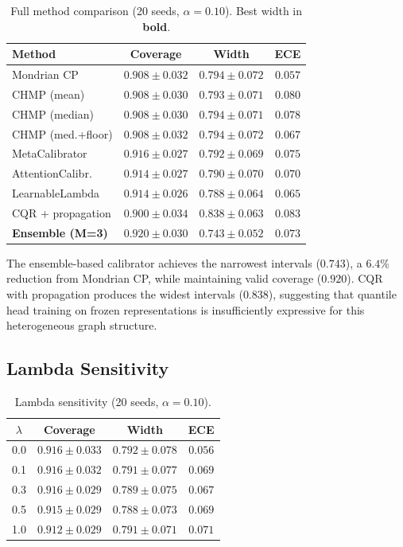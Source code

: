 \documentclass[twoside,11pt]{article}
\begin{document}
\begin{table}[ht]
\centering
\caption{Full method comparison (20 seeds, $\alpha = 0.10$).
Best width in \textbf{bold}.}
\label{tab:full}
\begin{tabular}{lccc}
\toprule
Method & Coverage & Width & ECE \\
\midrule
Mondrian CP & $0.908 \pm 0.032$ & $0.794 \pm 0.072$ & $\mathbf{0.057}$ \\
CHMP (mean) & $0.908 \pm 0.030$ & $0.793 \pm 0.071$ & $0.080$ \\
CHMP (median) & $0.908 \pm 0.030$ & $0.794 \pm 0.071$ & $0.078$ \\
CHMP (med.+floor) & $0.908 \pm 0.032$ & $0.794 \pm 0.072$ & $0.067$ \\
MetaCalibrator & $0.916 \pm 0.027$ & $0.792 \pm 0.069$ & $0.075$ \\
AttentionCalibr. & $0.914 \pm 0.027$ & $0.790 \pm 0.070$ & $0.070$ \\
LearnableLambda & $0.914 \pm 0.026$ & $0.788 \pm 0.064$ & $0.065$ \\
CQR + propagation & $0.900 \pm 0.034$ & $0.838 \pm 0.063$ & $0.083$ \\
\textbf{Ensemble (M=3)} & $0.920 \pm 0.030$ & $\mathbf{0.743 \pm 0.052}$ & $0.073$ \\
\bottomrule
\end{tabular}
\end{table}

The ensemble-based calibrator achieves the narrowest intervals ($0.743$), a
$6.4\%$ reduction from Mondrian CP, while maintaining valid coverage ($0.920$).
CQR with propagation produces the widest intervals ($0.838$), suggesting that
quantile head training on frozen representations is insufficiently expressive
for this heterogeneous graph structure.

\subsection{Lambda Sensitivity}

\begin{table}[ht]
\centering
\caption{Lambda sensitivity (20 seeds, $\alpha = 0.10$).}
\label{tab:lambda}
\begin{tabular}{cccc}
\toprule
$\lambda$ & Coverage & Width & ECE \\
\midrule
0.0 & $0.916 \pm 0.033$ & $0.792 \pm 0.078$ & $0.056$ \\
0.1 & $0.916 \pm 0.032$ & $0.791 \pm 0.077$ & $0.069$ \\
0.3 & $0.916 \pm 0.029$ & $0.789 \pm 0.075$ & $0.067$ \\
0.5 & $0.915 \pm 0.029$ & $0.788 \pm 0.073$ & $0.069$ \\
1.0 & $0.912 \pm 0.029$ & $0.791 \pm 0.071$ & $0.071$ \\
\bottomrule
\end{tabular}
\end{table}
\end{document}
